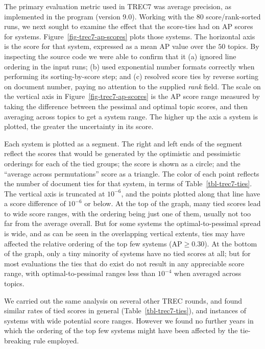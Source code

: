 The primary evaluation metric used in TREC7 was average precision, as
implemented in the program {\treceval} (version 9.0).
Working with the $80$ score/rank-sorted runs, we next sought to
examine the effect that the score-ties had on AP scores for systems.
Figure~\ref{fig-trec7-ap-scores} plots those systems.
The horizontal axis is the {\treceval} score for that system,
expressed as a mean AP value over the $50$ topics.
By inspecting the {\treceval} source code we were able to confirm
that it (a) ignored line ordering in the input runs; (b) used
exponential number formats correctly when performing its
sorting-by-score step; and (c) resolved score ties by reverse sorting
on document number, paying no attention to the supplied {\emph{rank}}
field.
The scale on the vertical axis in Figure~\ref{fig-trec7-ap-scores} is
the AP score range measured by taking the difference between the
pessimal and optimal topic scores, and then averaging across topics
to get a system range.
The higher up the axis a system is plotted, the greater the
uncertainty in its score.

Each system is plotted as a segment.
The right and left ends of the segment reflect the scores that would
be generated by the optimistic and pessimistic orderings for each of
the tied groups; the {\treceval} score is shown as a circle; and the
``average across permutations'' score as a triangle.
The color of each point reflects the number of document ties for that
system, in terms of Table~\ref{tbl-trec7-ties}.
The vertical axis is truncated at $10^{-6}$, and the points plotted
along that line have a score difference of $10^{-6}$ or below.
At the top of the graph, many tied scores lead to wide score ranges,
with the {\treceval} ordering being just one of them, usually not too
far from the average overall.
But for some systems the optimal-to-pessimal spread is wide, and as
can be seen in the overlapping vertical extents, ties may have
affected the relative ordering of the top few systems ($\mbox{AP}\ge
0.30$).
At the bottom of the graph, only a tiny minority of systems have no
tied scores at all; but for most evaluations the ties that do exist
do not result in any appreciable score range, with
optimal-to-pessimal ranges less than $10^{-4}$ when averaged across
topics.



We carried out the same analysis on several other TREC rounds, and
found similar rates of tied scores in general
(Table~\ref{tbl-trec7-ties}), and instances of systems with wide
potential score ranges.
However we found no further years in which the ordering of the
top few systems might have been affected by the tie-breaking rule
employed.


